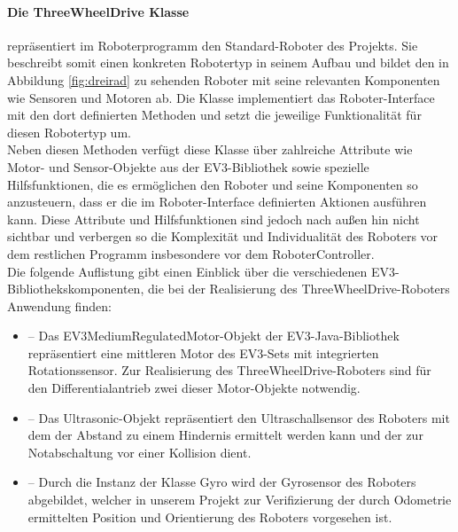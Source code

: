 \paragraph{Die ThreeWheelDrive Klasse}             %
repräsentiert im Roboterprogramm den \glqq{}Standard\grqq{}-Roboter des Projekts. Sie beschreibt somit einen konkreten 
Robotertyp in seinem Aufbau und bildet den in Abbildung \eqref{fig:dreirad} zu sehenden Roboter mit seine relevanten Komponenten wie Sensoren und
Motoren ab. Die Klasse implementiert das Roboter-Interface mit den dort definierten Methoden und setzt die jeweilige Funktionalität für diesen Robotertyp um.\\
Neben diesen Methoden verfügt diese Klasse über zahlreiche Attribute wie Motor- und Sensor-Objekte aus der 
EV3-Bibliothek sowie spezielle Hilfsfunktionen, die es ermöglichen den Roboter und seine Komponenten so anzusteuern, dass er die im 
Roboter-Interface definierten Aktionen ausführen kann. Diese Attribute und Hilfsfunktionen sind jedoch nach außen hin nicht
sichtbar und verbergen so die Komplexität und Individualität des Roboters vor dem restlichen Programm insbesondere vor dem 
RoboterController. \\
Die folgende Auflistung gibt einen Einblick über die verschiedenen EV3-Bibliothekskomponenten, die bei der Realisierung des 
ThreeWheelDrive-Roboters Anwendung finden:
\begin{itemize}
	\item{} -- Das EV3\-Me\-dium\-RegulatedMotor-Objekt der EV3-Java-Bibliothek
	repräsentiert eine mittleren Motor des EV3-Sets mit integrierten Rotationssensor. Zur Realisierung des ThreeWheel\-Drive-Roboters
	sind für den Differentialantrieb zwei dieser Motor-Objekte notwendig.
	\item{} -- Das Ultrasonic-Objekt repräsentiert den Ultraschallsensor des Roboters mit dem der 
	Abstand zu einem Hindernis ermittelt werden kann und der zur Notabschaltung vor einer Kollision dient.
	\item{} -- Durch die Instanz der Klasse Gyro wird der Gyrosensor des Roboters abgebildet, welcher in unserem
	Projekt zur Verifizierung der durch Odometrie ermittelten Position und Orientierung des Roboters vorgesehen ist.
\end{itemize}
